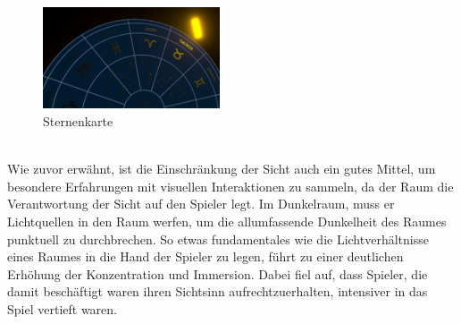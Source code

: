 \begin{figure}[h]
	\centering
	\includegraphics[width=\textwidth/3, height=3cm]{Pictures/Dunkelraum_Sternenkarte}
	\caption{Sternenkarte}
	\label{fig:dunkelraum_sternenkarte}
\end{figure}\\
Wie zuvor erwähnt, ist die Einschränkung der Sicht auch ein gutes Mittel, um besondere Erfahrungen mit visuellen Interaktionen zu sammeln, da der Raum die Verantwortung der Sicht auf den Spieler legt. Im Dunkelraum, muss er Lichtquellen in den Raum werfen, um die allumfassende Dunkelheit des Raumes punktuell zu durchbrechen. So etwas fundamentales wie die Lichtverhältnisse eines Raumes in die Hand der Spieler zu legen, führt zu einer deutlichen Erhöhung der Konzentration und Immersion. Dabei fiel auf, dass Spieler, die damit beschäftigt waren ihren Sichtsinn aufrechtzuerhalten, intensiver in das Spiel vertieft waren.

\newpage
\noindent
